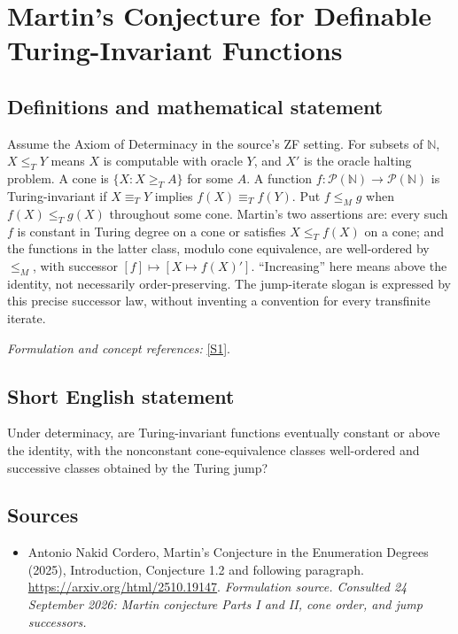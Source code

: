 \documentclass[11pt]{article}
\begin{document}
\section*{\texorpdfstring{Martin's Conjecture for Definable Turing-Invariant Functions}{Martin's Conjecture for Definable Turing-Invariant Functions}}\label{30006916}
\subsection{Definitions and mathematical statement}
Assume the Axiom of Determinacy in the source's ZF setting. For subsets of ${\mathbb{N}}$, $X\le_TY$ means $X$ is computable with oracle $Y$, and $X'$ is the oracle halting problem. A cone is $\{X:X\ge_TA\}$ for some $A$. A function $f:\mathcal P({\mathbb{N}})\to\mathcal P({\mathbb{N}})$ is Turing-invariant if $X\equiv_TY$ implies $f(X)\equiv_Tf(Y)$. Put $f\le_Mg$ when $f(X)\le_Tg(X)$ throughout some cone. Martin's two assertions are: every such $f$ is constant in Turing degree on a cone or satisfies $X\le_Tf(X)$ on a cone; and the functions in the latter class, modulo cone equivalence, are well-ordered by $\le_M$, with successor $[f]\mapsto[X\mapsto f(X)']$. ``Increasing'' here means above the identity, not necessarily order-preserving. The jump-iterate slogan is expressed by this precise successor law, without inventing a convention for every transfinite iterate.
\par\smallskip\textit{Formulation and concept references:} \href{https://arxiv.org/html/2510.19147}{[S1]}.

\subsection{Short English statement}
Under determinacy, are Turing-invariant functions eventually constant or above the identity, with the nonconstant cone-equivalence classes well-ordered and successive classes obtained by the Turing jump?
\subsection{Sources}
\begin{itemize}
\item[S1]Antonio Nakid Cordero, Martin's Conjecture in the Enumeration Degrees (2025), Introduction, Conjecture 1.2 and following paragraph.
\url{https://arxiv.org/html/2510.19147}.
\textit{Formulation source. Consulted 24 September 2026: Martin conjecture Parts I and II, cone order, and jump successors.}
\end{itemize}
\end{document}
